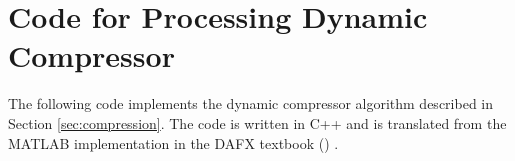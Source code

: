 \section{Code for Processing Dynamic Compressor}
\label{app:compressor_Code}

The following code implements the dynamic compressor algorithm described in Section \ref{sec:compression}. 
The code is written in C++ and is translated from the MATLAB implementation in the DAFX textbook 
() \cite{openai_chatgpt,dutilleux_nonlinear2011}.




